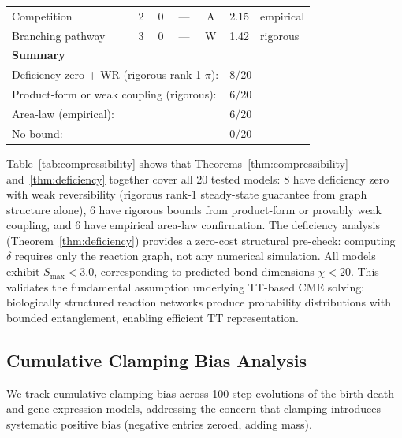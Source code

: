 \documentclass[11pt]{article}
\begin{document}
\begin{table}[t]
\begin{tabular}{lcccccl}
Competition          & 2 & 0 & ---        & A   & 2.15 & empirical \\
Branching pathway    & 3 & 0 & ---        & W   & 1.42 & rigorous \\
\midrule
\multicolumn{5}{l}{\textbf{Summary}} & & \\
\multicolumn{5}{l}{Deficiency-zero + WR (rigorous rank-1 $\pi$):} & \multicolumn{2}{l}{8/20} \\
\multicolumn{5}{l}{Product-form or weak coupling (rigorous):} & \multicolumn{2}{l}{6/20} \\
\multicolumn{5}{l}{Area-law (empirical):} & \multicolumn{2}{l}{6/20} \\
\multicolumn{5}{l}{No bound:} & \multicolumn{2}{l}{0/20} \\
\bottomrule
\end{tabular}
\end{table}

Table~\ref{tab:compressibility} shows that Theorems~\ref{thm:compressibility}
and~\ref{thm:deficiency} together cover all 20 tested models:
8 have deficiency zero with weak reversibility (rigorous rank-1 steady-state
guarantee from graph structure alone), 6 have rigorous bounds from product-form
or provably weak coupling, and 6 have empirical area-law confirmation.
The deficiency analysis (Theorem~\ref{thm:deficiency}) provides a
zero-cost structural pre-check: computing $\delta$ requires only the
reaction graph, not any numerical simulation.
All models exhibit $S_{\max} < 3.0$, corresponding to predicted
bond dimensions $\chi < 20$.
This validates the fundamental assumption underlying TT-based CME solving:
biologically structured reaction networks produce probability distributions
with bounded entanglement, enabling efficient TT representation.

\subsection{Cumulative Clamping Bias Analysis}\label{sec:exp:cumulative}

We track cumulative clamping bias across 100-step evolutions of the
birth-death and gene expression models, addressing the concern that
clamping introduces systematic positive bias (negative entries zeroed,
adding mass).
\end{document}
